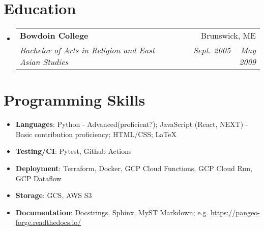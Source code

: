 \documentclass[letterpaper,11pt]{article}
\makeatletter
\newcommand{\resumeItem}[2]{
  \item[]\small{
    \textbf{#1}{: #2 \vspace{-2pt}}
  }
}
\newcommand{\resumeSubheading}[4]{
  \vspace{-0.5pt}\item[]
    \begin{tabular*}{0.999\textwidth}[t]{l@{\extracolsep{\fill}}r}
      \textbf{#1} & #2 \\
      \textit{\small#3} & \textit{\small #4} \\
    \end{tabular*}\vspace{-5pt}
}
\newcommand{\resumeSubItem}[2]{\resumeItem{#1}{#2}\vspace{-4pt}}
\newcommand{\resumeSubHeadingListStart}{\begin{itemize}[leftmargin=1pt]}
\newcommand{\resumeSubHeadingListEnd}{\end{itemize}}
\makeatother
\begin{document}
\section{Education}
\resumeSubHeadingListStart
  \resumeSubheading
    {Bowdoin College}{Brunswick, ME}
    {Bachelor of Arts in Religion and East Asian Studies}{Sept. 2005 -- May 2009}
\resumeSubHeadingListEnd

\section{Programming Skills}
  \resumeSubHeadingListStart
    \resumeSubItem{Languages}
      {Python - Advanced(proficient?); JavaScript (React, NEXT) - Basic contribution proficiency; HTML/CSS; LaTeX}
    \resumeSubItem{Testing/CI}
      {Pytest, Github Actions}
    \resumeSubItem{Deployment}
      {Terraform, Docker, GCP Cloud Functions, GCP Cloud Run, GCP Dataflow}
    \resumeSubItem{Storage}
      {GCS, AWS S3}
    \resumeSubItem{Documentation}
      {Docstrings, Sphinx, MyST Markdown; e.g. \href{https://pangeo-forge.readthedocs.io/}{https://pangeo-forge.readthedocs.io/}}
  \resumeSubHeadingListEnd


\end{document}
